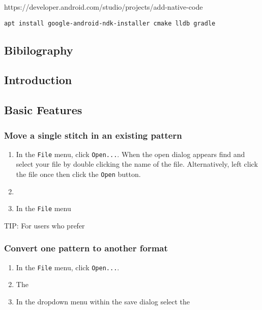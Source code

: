 https://developer.android.com/studio/projects/add-native-code

\begin{verbatim}
apt install google-android-ndk-installer cmake lldb gradle
\end{verbatim}

\hypertarget{bibilography}{%
\subsection{Bibilography}\label{bibilography}}

\hypertarget{introduction-1}{%
\subsection{Introduction}\label{introduction-1}}

\hypertarget{basic-features-1}{%
\subsection{Basic Features}\label{basic-features-1}}

\hypertarget{move-a-single-stitch-in-an-existing-pattern-1}{%
\subsubsection{Move a single stitch in an existing
pattern}\label{move-a-single-stitch-in-an-existing-pattern-1}}

\begin{enumerate}
\def\labelenumi{\arabic{enumi}.}
\tightlist
\item
  In the \texttt{File} menu, click \texttt{Open...}. When the open
  dialog appears find and select your file by double clicking the name
  of the file. Alternatively, left click the file once then click the
  \texttt{Open} button.
\item
\item
  In the \texttt{File} menu
\end{enumerate}

TIP: For users who prefer

\hypertarget{convert-one-pattern-to-another-format-1}{%
\subsubsection{Convert one pattern to another
format}\label{convert-one-pattern-to-another-format-1}}

\begin{enumerate}
\def\labelenumi{\arabic{enumi}.}
\tightlist
\item
  In the \texttt{File} menu, click \texttt{Open...}.
\item
  The
\item
  In the dropdown menu within the save dialog select the
\end{enumerate}

